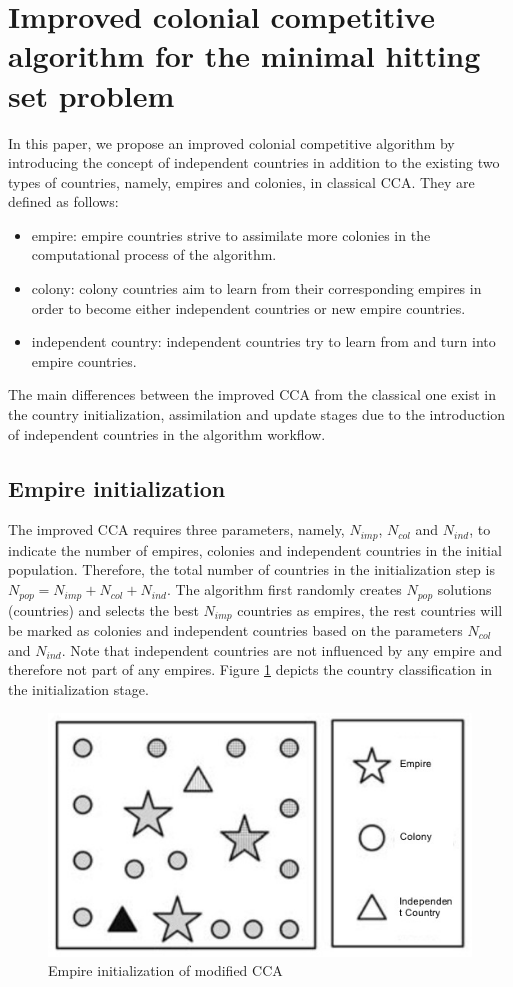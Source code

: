 \section{Improved colonial competitive algorithm for the minimal hitting set problem}
In this paper, we propose an improved colonial competitive algorithm by introducing the concept of independent countries in addition to the existing two types of countries, namely, empires and colonies, in classical CCA.
They are defined as follows:
\begin{itemize}
	\item empire: empire countries strive to assimilate more colonies in the computational process of the algorithm.
	\item colony: colony countries aim to learn from their corresponding empires in order to become either independent countries or new empire countries.
	\item independent country: independent countries try to learn from and turn into empire countries.
\end{itemize}

The main differences between the improved CCA from the classical one exist in the country initialization, assimilation and update stages due to the introduction of independent countries in the algorithm workflow.


\subsection{Empire initialization}
The improved CCA requires three parameters, namely, $N_{imp}$, $N_{col}$ and $N_{ind}$, to indicate the number of empires, colonies and independent countries in the initial population.
Therefore, the total number of countries in the initialization step is $N_{pop} = N_{imp} + N_{col} + N_{ind}$.
The algorithm first randomly creates $N_{pop}$ solutions (countries) and selects the best $N_{imp}$ countries as empires, the rest countries will be marked as colonies and independent countries based on the parameters $N_{col}$ and $N_{ind}$.
Note that independent countries are not influenced by any empire and therefore not part of any empires.
Figure \ref{fig:fig1} depicts the country classification in the initialization stage.


\begin{figure}[h!]
	\begin{center}
		\includegraphics[width=0.8\linewidth]{sections/figure1.jpg}
		\caption{Empire initialization of modified CCA}
		\label{fig:fig1}
	\end{center}
\end{figure}


